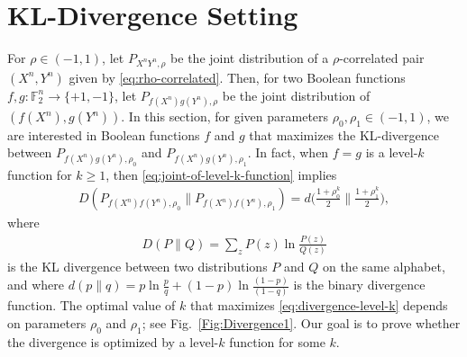\documentclass[journal,draftcls, onecolumn]{IEEEtran}
\newcommand{\bol}[1]{\mathbf{#1}}
\begin{document}

\section{KL-Divergence Setting} \label{section:KL}


For $\rho \in (-1,1)$, let $P_{X^nY^n,\rho}$ be the joint distribution
of a $\rho$-correlated pair $(X^n,Y^n)$ given by \eqref{eq:rho-correlated}.
Then, for two Boolean functions $f,g:\mathbb{F}_2^n \to \{+1,-1\}$, let $P_{f(X^n)g(Y^n),\rho}$
be the joint distribution of $(f(X^n),g(Y^n))$.
In this section, for given parameters $\rho_0,\rho_1 \in (-1,1)$, we are interested in
Boolean functions $f$ and $g$ that maximizes the KL-divergence between
$P_{f(X^n)g(Y^n),\rho_0}$ and $P_{f(X^n)g(Y^n),\rho_1}$. In fact, when $f=g$ is a level-$k$ function for $k\ge1$, then \eqref{eq:joint-of-level-k-function}
implies 
\begin{align} \label{eq:divergence-level-k}
D(P_{f(X^n)f(Y^n),\rho_0} \| P_{f(X^n)f(Y^n),\rho_1}) = d\bigg(\frac{1+\rho_0^k}{2} \bigg\| \frac{1+\rho_1^k}{2}\bigg),
\end{align}
where 
\begin{align*}
D(P\|Q) = \sum_z P(z)\ln\frac{P(z)}{Q(z)}
\end{align*}
is the KL divergence between two distributions $P$ and $Q$ on the same alphabet, and where 
$d(p\|q) = p\ln \frac{p}{q}+(1-p)\ln \frac{(1-p)}{(1-q)}$ is the binary divergence function. 
The optimal value of $k$ that maximizes \eqref{eq:divergence-level-k} depends on parameters $\rho_0$ and $\rho_1$; see Fig.~\ref{Fig:Divergence1}.
Our goal is to prove whether the divergence is optimized by a level-$k$ function for some $k$. 
\end{document}
